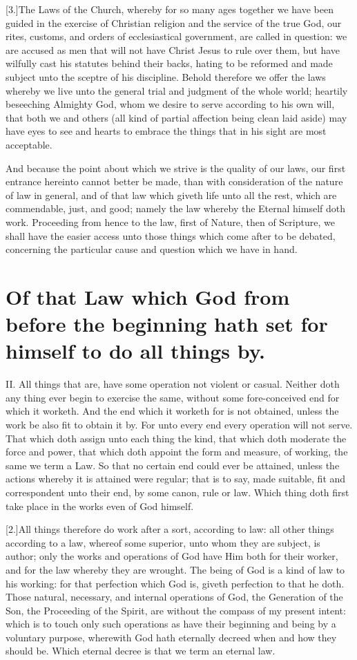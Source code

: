 [3.]The Laws of the Church, whereby for so many ages together we have been guided in the exercise of Christian religion and the service of the true God, our rites, customs, and orders of ecclesiastical government, are called in question: we are accused as men that will not have Christ Jesus to rule over them, but have wilfully cast his statutes behind their backs, hating to be reformed and made subject unto the sceptre of his discipline. Behold therefore we offer the laws whereby we live unto the general trial and judgment of the whole world; heartily beseeching Almighty God, whom we desire to serve according to his own will, that both we  and others (all kind of partial affection being clean laid aside) may have eyes to see and hearts to embrace the things that in his sight are most acceptable.

And because the point about which we strive is the quality of our laws, our first entrance hereinto cannot better be made, than with consideration of the nature of law in general, and of that law which giveth life unto all the rest, which are commendable, just, and good; namely the law whereby the Eternal himself doth work. Proceeding from hence to the law, first of Nature, then of Scripture, we shall have the easier access unto those things which come after to be debated, concerning the particular cause and question which we have in hand.

\section*{Of that Law which God from before the beginning hath set for himself to do all things by.}

II. All things that are, have some operation not violent or casual. Neither doth any thing ever begin to exercise the same, without some fore-conceived end for which it worketh. And the end which it worketh for is not obtained, unless the work be also fit to obtain it by. For unto every end every operation will not serve. That which doth assign unto each thing the kind, that which doth moderate the force and power, that which doth appoint the form and measure, of working, the same we term a Law. So that no certain end could ever be attained, unless the actions whereby it is attained were regular; that is to say, made suitable, fit and correspondent unto their end, by some canon, rule or law. Which thing doth first take place in the works even of God himself.

[2.]All things therefore do work after a sort, according to law: all other things according to a law, whereof some superior, unto whom they are subject, is author; only the works and operations of God have Him both for their worker, and for the law whereby they are wrought. The being of God is a kind of law to his working: for that perfection which God is, giveth perfection to that he doth. Those natural, necessary, and internal operations of God, the Generation of the Son, the Proceeding of the Spirit, are without the compass of my present intent: which is to touch only such operations as have their beginning and being by a voluntary purpose, wherewith God hath eternally decreed when and how they should be. Which eternal decree is that we term an eternal law.


